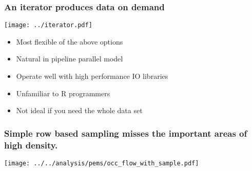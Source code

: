 \documentclass{beamer}
\begin{document}
\begin{frame}

    \frametitle{An iterator produces data on demand}

    \centerline{\texttt{[image: ../iterator.pdf]}}

    \begin{itemize}
        \item Most flexible of the above options
        \item Natural in pipeline parallel model
        \item Operate well with high performance IO libraries
    \end{itemize}


    \begin{itemize}
        \item Unfamiliar to R programmers
        \item Not ideal if you need the whole data set
    \end{itemize}


\end{frame}
\begin{frame}

    \frametitle{Simple row based sampling misses the important areas of high
    density.}

    \centerline{\texttt{[image: ../../analysis/pems/occ\_flow\_with\_sample.pdf]}}



\end{frame}
\end{document}
